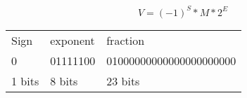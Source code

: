 \documentclass[en, 11pt, xcolor=dvipsnames]{beamer}
\begin{document}
\begin{frame}[fragile]


	\begin{columns}[c]
		\begin{column}{0.9\textwidth}

			\[
				V = (-1)^{S} * M * 2^E
			\]

			\begin{table}
				\begin{tabular}{l l l}
					Sign   & exponent & fraction                \\
					0      & 01111100 & 01000000000000000000000 \\
					1 bits & 8 bits   & 23 bits                 \\
				\end{tabular}
			\end{table}

		\end{column}
	\end{columns}

\end{frame}
\end{document}

